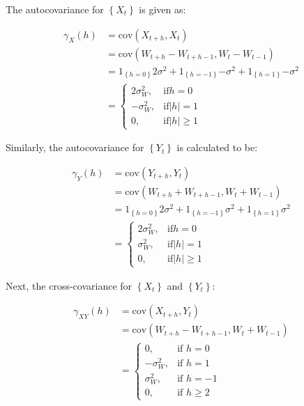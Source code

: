 \documentclass[]{book}
\theoremstyle{definition}
\theoremstyle{definition}
\theoremstyle{definition}
\theoremstyle{remark}
\begin{document}
{The autocovariance for \(\left\{X_t\right\}\) is given as:

\[\begin{aligned}
     {\gamma _X}\left( h \right) &= \text{cov} \left( {{X_{t + h}},{X_t}} \right) \\
     &= \text{cov} \left( {{W_{t + h}} - {W_{t + h - 1}},{W_t} - {W_{t - 1}}} \right) \\
     &= {1_{\left\{ {h = 0} \right\}}}2{\sigma ^2} + {1_{\left\{ {h =  - 1} \right\}}}{-\sigma ^2} + {1_{\left\{ {h = 1} \right\}}}{-\sigma ^2} \\
     &= \begin{cases}
     2\sigma^2_W, &\text{if} h = 0 \\
     -\sigma^2_W, &\text{if} \left|h\right| = 1 \\
     0, &\text{if} \left|h\right| \ge 1 
     \end{cases} 
     \end{aligned} \]

Similarly, the autocovariance for \(\left\{Y_t\right\}\) is calculated
to be:

\[\begin{aligned}
     {\gamma _Y}\left( h \right) &= \text{cov} \left( {{Y_{t + h}},{Y_t}} \right) \\
     &= \text{cov} \left( {{W_{t + h}} + {W_{t + h - 1}},{W_t} + {W_{t - 1}}} \right) \\
     &= {1_{\left\{ {h = 0} \right\}}}2{\sigma ^2} + {1_{\left\{ {h =  - 1} \right\}}}{\sigma ^2} + {1_{\left\{ {h = 1} \right\}}}{\sigma ^2} \\ 
     &= \begin{cases}
     2\sigma^2_W, &\text{if} h = 0 \\
     \sigma^2_W, &\text{if} \left|h\right| = 1 \\
     0, &\text{if} \left|h\right| \ge 1 
     \end{cases} 
     \end{aligned} \]

Next, the cross-covariance for \(\left\{X_t\right\}\) and
\(\left\{Y_t\right\}\):

\[\begin{aligned}
     {\gamma _{XY}}\left( h \right) &= \text{cov} \left( {{X_{t + h}},{Y_t}} \right) \\
     &= \text{cov} \left( {{W_{t + h}} - {W_{t + h - 1}},{W_t} + {W_{t-1}}} \right)  \\ 
     &= \begin{cases}
     0, &\text{if } h = 0 \\
     -\sigma^2_W, &\text{if } h = 1 \\
     \sigma^2_W, &\text{if } h = -1 \\
     0, &\text{if } h \ge 2
     \end{cases}
     \end{aligned}\]

}
\end{document}

